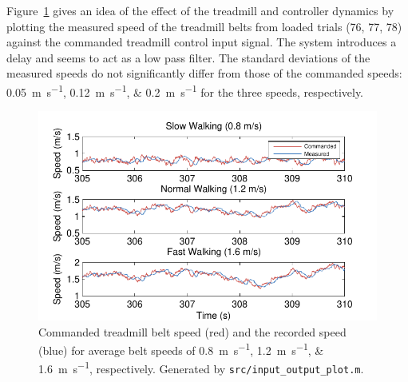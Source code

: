 \documentclass[fleqn,12pt]{wlpeerj}
\begin{document}
Figure~\ref{fig:input_output} gives an idea of the effect of the treadmill and
controller dynamics by plotting the measured speed of the treadmill belts from
loaded trials (76, 77, 78) against the commanded treadmill control input
signal. The system introduces a delay and seems to act as a low pass filter.
The standard deviations of the measured speeds do not significantly differ from
those of the commanded speeds: \SIlist{0.05;0.12;0.2}{\meter\per\second} for
the three speeds, respectively.
%
\begin{figure}
  \centering
  \includegraphics{figures/input_vs_output.pdf}
  \cprotect\caption{Commanded treadmill belt speed (red) and the recorded speed
    (blue) for average belt speeds of \SIlist{0.8;1.2;1.6}{\meter\per\second},
    respectively. Generated by \verb|src/input_output_plot.m|.}
  \label{fig:input_output}
\end{figure}
\end{document}
